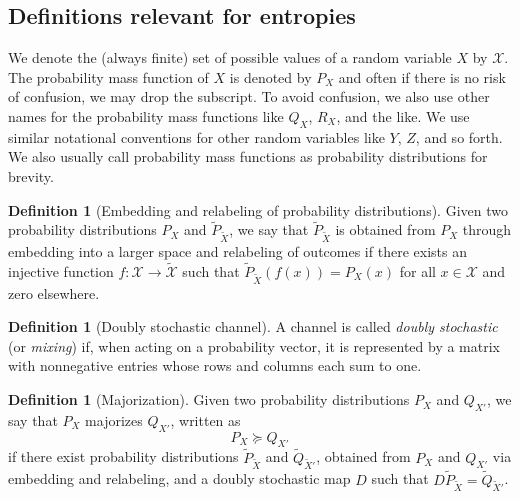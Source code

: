 \documentclass[aps,pra,11pt,onecolumn,nofootinbib,tightenlines]{revtex4-2}
\theoremstyle{definition}
\newtheorem{definition}[theorem]{Definition}
\newcommand{\mc}[1]{\mathcal{#1}}
\begin{document}
\subsection{Definitions relevant for entropies}

We denote the (always finite) set of possible values of a random variable $X$ by $\mc X$. The probability mass function of $X$ is denoted by $P_X$ and often if there is no risk of confusion, we may drop the subscript. To avoid confusion, we also use other names for the probability mass functions like $Q_X$, $R_X$, and the like. We use similar notational conventions for other random variables like $Y$, $Z$, and so forth. We also usually call probability mass functions as probability distributions for brevity.

\begin{definition}[Embedding and relabeling of probability distributions]
Given two probability distributions \(P_{X}\) and \(\widetilde{P}_{\widetilde{X}}\), we say that \(\widetilde{P}_{\widetilde{X}}\) is obtained from \(P_{X}\) through embedding into a larger space and relabeling of outcomes if there exists an injective function \( f : \mathcal{X} \to \widetilde{\mathcal{X}} \) such that  $\widetilde{P}_{\widetilde{X}}(f(x)) = P_X(x)$
for all $x \in \mathcal{X}$
and zero elsewhere.
\end{definition}

\begin{definition}[Doubly stochastic channel]
A channel is called \emph{doubly stochastic} (or \emph{mixing}) if, when acting on a probability vector, it is represented by a matrix with nonnegative entries whose rows and columns each sum to one.
\end{definition}

\begin{definition}[Majorization]
Given two probability distributions $P_X$ and $Q_{X'}$, we say that $P_X$ majorizes $Q_{X'}$, written as
\begin{equation}
    P_X \succeq Q_{X'}
\end{equation}
if there exist probability distributions \(\widetilde{P}_{\widetilde{X}}\) and \(\widetilde{Q}_{\widetilde{X}'}\), obtained from \(P_X\) and \(Q_{X'}\) via embedding and relabeling, and a doubly stochastic map \(D\) such that $D \widetilde{P}_{\widetilde{X}} = \widetilde{Q}_{\widetilde{X}'}$.
\end{definition}
\end{document}

